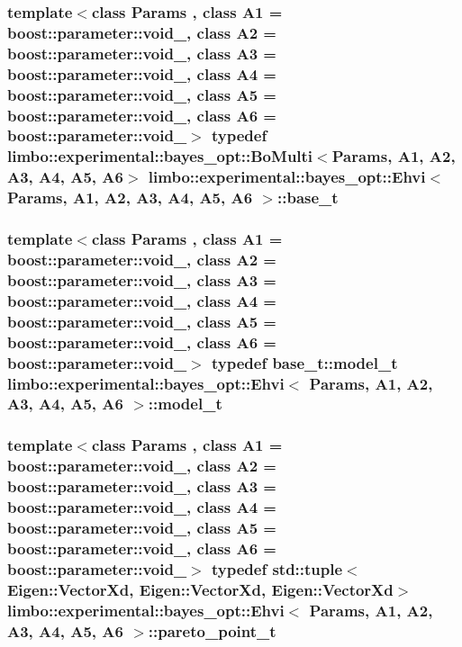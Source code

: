 \subsubsection[{base\+\_\+t}]{\setlength{\rightskip}{0pt plus 5cm}template$<$class Params , class A1  = boost\+::parameter\+::void\+\_\+, class A2  = boost\+::parameter\+::void\+\_\+, class A3  = boost\+::parameter\+::void\+\_\+, class A4  = boost\+::parameter\+::void\+\_\+, class A5  = boost\+::parameter\+::void\+\_\+, class A6  = boost\+::parameter\+::void\+\_\+$>$ typedef {\bf limbo\+::experimental\+::bayes\+\_\+opt\+::\+Bo\+Multi}$<$Params, A1, A2, A3, A4, A5, A6$>$ {\bf limbo\+::experimental\+::bayes\+\_\+opt\+::\+Ehvi}$<$ Params, A1, A2, A3, A4, A5, A6 $>$\+::{\bf base\+\_\+t}}\label{classlimbo_1_1experimental_1_1bayes__opt_1_1_ehvi_ad0955fc65023479e48d85c50f1b2804d}
\hypertarget{classlimbo_1_1experimental_1_1bayes__opt_1_1_ehvi_af064e606073005f78ef0445d4ab4bc31}{}
\subsubsection[{model\+\_\+t}]{\setlength{\rightskip}{0pt plus 5cm}template$<$class Params , class A1  = boost\+::parameter\+::void\+\_\+, class A2  = boost\+::parameter\+::void\+\_\+, class A3  = boost\+::parameter\+::void\+\_\+, class A4  = boost\+::parameter\+::void\+\_\+, class A5  = boost\+::parameter\+::void\+\_\+, class A6  = boost\+::parameter\+::void\+\_\+$>$ typedef {\bf base\+\_\+t\+::model\+\_\+t} {\bf limbo\+::experimental\+::bayes\+\_\+opt\+::\+Ehvi}$<$ Params, A1, A2, A3, A4, A5, A6 $>$\+::{\bf model\+\_\+t}}\label{classlimbo_1_1experimental_1_1bayes__opt_1_1_ehvi_af064e606073005f78ef0445d4ab4bc31}
\hypertarget{classlimbo_1_1experimental_1_1bayes__opt_1_1_ehvi_a8e741bf553820c0f0af7b9545d2d773c}{}
\subsubsection[{pareto\+\_\+point\+\_\+t}]{\setlength{\rightskip}{0pt plus 5cm}template$<$class Params , class A1  = boost\+::parameter\+::void\+\_\+, class A2  = boost\+::parameter\+::void\+\_\+, class A3  = boost\+::parameter\+::void\+\_\+, class A4  = boost\+::parameter\+::void\+\_\+, class A5  = boost\+::parameter\+::void\+\_\+, class A6  = boost\+::parameter\+::void\+\_\+$>$ typedef std\+::tuple$<$Eigen\+::\+Vector\+Xd, Eigen\+::\+Vector\+Xd, Eigen\+::\+Vector\+Xd$>$ {\bf limbo\+::experimental\+::bayes\+\_\+opt\+::\+Ehvi}$<$ Params, A1, A2, A3, A4, A5, A6 $>$\+::{\bf pareto\+\_\+point\+\_\+t}}\label{classlimbo_1_1experimental_1_1bayes__opt_1_1_ehvi_a8e741bf553820c0f0af7b9545d2d773c}


